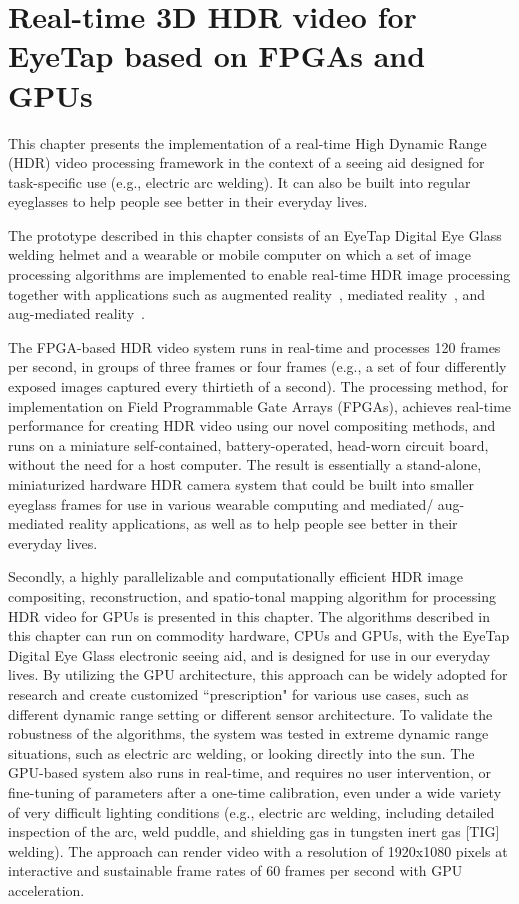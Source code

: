 \chapter{Real-time 3D HDR video for EyeTap based on FPGAs and GPUs}
\label{realtimehdrfpgas}

This chapter presents the implementation of a real-time High Dynamic Range (HDR) video 
processing framework in the context of a seeing aid designed for task-specific use (e.g., electric arc 
welding). It can also be built into regular eyeglasses to help people see better in their everyday lives.

The prototype described in this chapter consists of an EyeTap Digital Eye Glass welding helmet and 
a wearable or mobile computer on which a set of image processing algorithms are implemented to 
enable real-time HDR image processing together with applications such as augmented 
reality~\cite{feiner1997touring,starner1997augmented}, mediated reality~\cite{mann1994mediated}, 
and aug-mediated reality~\cite{mannaaai361}. 

The FPGA-based HDR video system runs in real-time and processes 120 frames per second, in 
groups of three frames or four frames (e.g., a set of four differently exposed images captured every 
thirtieth of a second). The processing method, for implementation on Field Programmable Gate 
Arrays (FPGAs), achieves real-time performance for creating HDR video using our novel compositing 
methods, and runs on a miniature self-contained, battery-operated, head-worn circuit board, without 
the need for a host computer.  The result is essentially a stand-alone, miniaturized hardware HDR 
camera system that could be built into smaller eyeglass frames for use in various wearable 
computing and mediated/ aug-mediated reality applications, as well as to help people see better in 
their everyday lives.

Secondly, a highly parallelizable and computationally efficient HDR image compositing, 
reconstruction, and spatio-tonal mapping algorithm for processing HDR video for GPUs is presented 
in this chapter. The algorithms described in this chapter can run on commodity hardware, CPUs and 
GPUs, with the EyeTap Digital Eye Glass electronic seeing aid, and is designed for use in our 
everyday lives. By utilizing the GPU architecture, this approach can be widely adopted for research 
and create customized ``prescription" for various use cases, such as different dynamic range setting 
or different sensor architecture. To validate the robustness of the algorithms, the system was tested 
in extreme dynamic range situations, such as electric arc welding, or looking directly into the sun. 
The GPU-based system also runs in real-time, and requires no user intervention, or fine-tuning of 
parameters after a one-time calibration, even under a wide variety of very difficult lighting conditions 
(e.g., electric arc welding, including detailed inspection of the arc, weld puddle, and shielding gas in 
tungsten inert gas [TIG] welding). The approach can render video with a resolution of 1920x1080 
pixels at interactive and sustainable frame rates of 60 frames per second with GPU acceleration.


